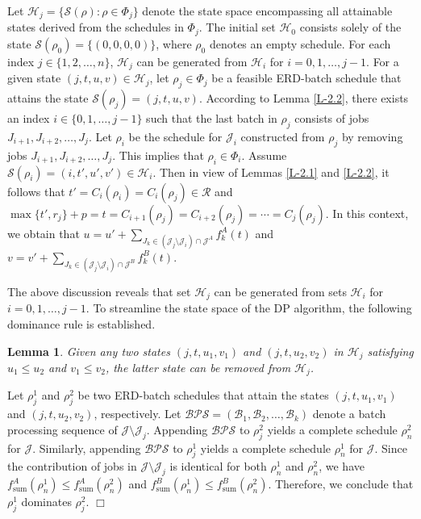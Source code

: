 \documentclass[12pt]{article}
\newtheorem{lemma}{Lemma}[section]
\begin{document}
\begin{sloppypar}
Let $\mathcal{H}_j=\{\mathcal{S}(\rho): \rho \in \Phi_j\}$ denote the state space encompassing all attainable states derived from the schedules in $\Phi_j$.
The initial set $\mathcal{H}_0$ consists solely of the state $\mathcal{S}(\rho_0)=\{(0, 0, 0, 0)\}$,
where $\rho_0$ denotes an empty schedule. For each index $j \in \{1, 2, \ldots, n\}$, $\mathcal{H}_j$ can be
generated from $\mathcal{H}_i$ for $i=0, 1, \ldots, j-1$.
For a given state $(j, t, u, v) \in \mathcal{H}_j$, let $\rho_j \in \Phi_j$ be a feasible ERD-batch schedule that attains the state $\mathcal{S}(\rho_j)=(j, t, u, v)$. According to Lemma \ref{L-2.2}, there exists an index $i \in \{0, 1, \ldots, j-1\}$ such that the last batch in $\rho_j$ consists of jobs $J_{i+1}, J_{i+2}, \ldots, J_j$. Let $\rho_i$ be the schedule for $\mathcal{J}_i$ constructed from $\rho_j$ by removing jobs $J_{i+1}, J_{i+2}, \ldots, J_j$. This implies that
$\rho_i \in \Phi_i$. Assume $\mathcal{S}(\rho_i)=(i, t', u', v') \in \mathcal{H}_i$. Then in view of Lemmas \ref{L-2.1} and \ref{L-2.2}, it follows that $t'=C_i(\rho_i)=C_i(\rho_j) \in \mathcal{R}$ and $\max \{t', r_j\}+p = t=C_{i+1}(\rho_j)=C_{i+2}(\rho_j)=\cdots=C_j(\rho_j)$.
In this context, we obtain that  $u=u'+\sum_{J_k \in (\mathcal{J}_j \setminus \mathcal{J}_i) \cap \mathcal{J}^{A}} f_k^A(t)$ and $v=v'+\sum_{J_k \in (\mathcal{J}_j \setminus \mathcal{J}_i) \cap \mathcal{J}^{B}} f_k^B(t)$.

The above discussion reveals that set $\mathcal{H}_j$ can be generated from sets $\mathcal{H}_i$ for $i=0, 1, \ldots, j-1$. To streamline the state space of the DP algorithm, the following dominance rule is established.

\begin{lemma} \label{L-5.1}
Given any two states $(j, t, u_1, v_1)$ and $(j, t, u_2, v_2)$ in $\mathcal{H}_j$ satisfying $u_1 \leq u_2$ and $v_1 \leq v_2$, the latter state can be removed from $\mathcal{H}_j$.
\end{lemma}

 Let $\rho_j^1$ and $\rho_j^2$ be two ERD-batch schedules that attain the states $(j, t, u_1, v_1)$ and $(j, t, u_2, v_2)$, respectively. Let $\mathcal{BPS}=(\mathcal{B}_1, \mathcal{B}_2, \ldots, \mathcal{B}_k)$ denote a batch processing sequence of $\mathcal{J} \setminus \mathcal{J}_j$. Appending $\mathcal{BPS}$ to $\rho_j^2$ yields a complete schedule $\rho_n^2$ for $\mathcal{J}$. Similarly, appending $\mathcal{BPS}$ to $\rho_j^1$ yields a complete schedule $\rho_n^1$ for $\mathcal{J}$. Since the contribution of jobs in $\mathcal{J} \setminus \mathcal{J}_j$ is identical for both $\rho_n^1$ and $\rho_n^2$, we have $f_{\mathrm{sum}}^A(\rho_n^1) \leq f_{\mathrm{sum}}^A(\rho_n^2)$ and
$f_{\mathrm{sum}}^B(\rho_n^1) \leq f_{\mathrm{sum}}^B(\rho_n^2)$.
Therefore, we conclude that $\rho_j^1$ dominates $\rho_j^2$. \hfill$\Box$\\


\end{sloppypar}
\end{document}
